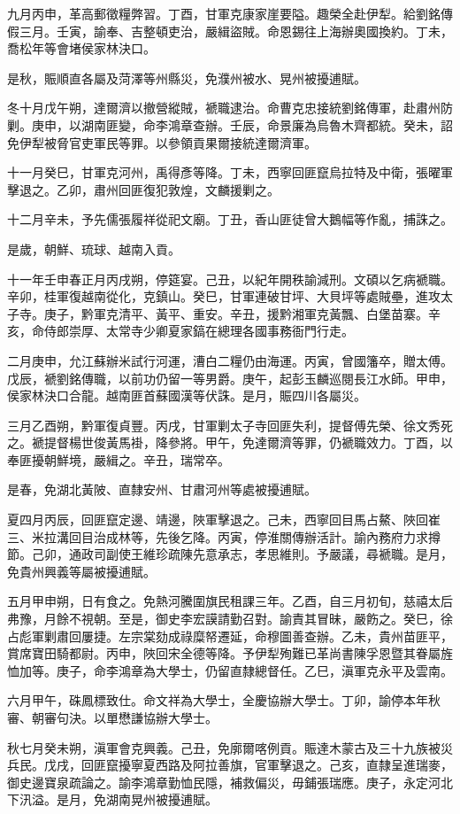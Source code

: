 \begin{pinyinscope}
九月丙申，革高郵徵糧弊習。丁酉，甘軍克康家崖要隘。趣榮全赴伊犁。給劉銘傳假三月。壬寅，諭奉、吉整頓吏治，嚴緝盜賊。命恩錫往上海辦奧國換約。丁未，喬松年等會堵侯家林決口。

是秋，賑順直各屬及菏澤等州縣災，免濮州被水、晃州被擾逋賦。

冬十月戊午朔，達爾濟以撤營縱賊，褫職逮治。命曹克忠接統劉銘傳軍，赴肅州防剿。庚申，以湖南匪變，命李鴻章查辦。壬辰，命景廉為烏魯木齊都統。癸未，詔免伊犁被脅官吏軍民等罪。以參領貢果爾接統達爾濟軍。

十一月癸巳，甘軍克河州，禹得彥等降。丁未，西寧回匪竄烏拉特及中衛，張曜軍擊退之。乙卯，肅州回匪復犯敦煌，文麟援剿之。

十二月辛未，予先儒張履祥從祀文廟。丁丑，香山匪徒曾大鵝幅等作亂，捕誅之。

是歲，朝鮮、琉球、越南入貢。

十一年壬申春正月丙戌朔，停筵宴。己丑，以紀年開秩諭減刑。文碩以乞病褫職。辛卯，桂軍復越南從化，克鎮山。癸巳，甘軍連破甘坪、大貝坪等處賊壘，進攻太子寺。庚子，黔軍克清平、黃平、重安。辛丑，援黔湘軍克黃飄、白堡苗寨。辛亥，命侍郎崇厚、太常寺少卿夏家鎬在總理各國事務衙門行走。

二月庚申，允江蘇辦米試行河運，漕白二糧仍由海運。丙寅，曾國籓卒，贈太傅。戊辰，褫劉銘傳職，以前功仍留一等男爵。庚午，起彭玉麟巡閱長江水師。甲申，侯家林決口合龍。越南匪首蘇國漢等伏誅。是月，賑四川各屬災。

三月乙酉朔，黔軍復貞豐。丙戌，甘軍剿太子寺回匪失利，提督傅先榮、徐文秀死之。褫提督楊世俊黃馬褂，降參將。甲午，免達爾濟等罪，仍褫職效力。丁酉，以奉匪擾朝鮮境，嚴緝之。辛丑，瑞常卒。

是春，免湖北黃陂、直隸安州、甘肅河州等處被擾逋賦。

夏四月丙辰，回匪竄定邊、靖邊，陜軍擊退之。己未，西寧回目馬占鰲、陜回崔三、米拉溝回目治成林等，先後乞降。丙寅，停淮關傳辦活計。諭內務府力求撙節。己卯，通政司副使王維珍疏陳先意承志，孝思維則。予嚴議，尋褫職。是月，免貴州興義等屬被擾逋賦。

五月甲申朔，日有食之。免熱河騰圍旗民租課三年。乙酉，自三月初旬，慈禧太后弗豫，月餘不視朝。至是，御史李宏謨請勤召對。諭責其冒昧，嚴飭之。癸巳，徐占彪軍剿肅回屢捷。左宗棠劾成祿糜帑遷延，命穆圖善查辦。乙未，貴州苗匪平，賞席寶田騎都尉。丙申，陜回宋全德等降。予伊犁殉難已革尚書陳孚恩暨其眷屬旌恤加等。庚子，命李鴻章為大學士，仍留直隸總督任。乙巳，滇軍克永平及雲南。

六月甲午，硃鳳標致仕。命文祥為大學士，全慶協辦大學士。丁卯，諭停本年秋審、朝審句決。以單懋謙協辦大學士。

秋七月癸未朔，滇軍會克興義。己丑，免廓爾喀例貢。賑達木蒙古及三十九族被災兵民。戊戌，回匪竄擾寧夏西路及阿拉善旗，官軍擊退之。己亥，直隸呈進瑞麥，御史邊寶泉疏論之。諭李鴻章勤恤民隱，補救偏災，毋鋪張瑞應。庚子，永定河北下汛溢。是月，免湖南晃州被擾逋賦。


\end{pinyinscope}
